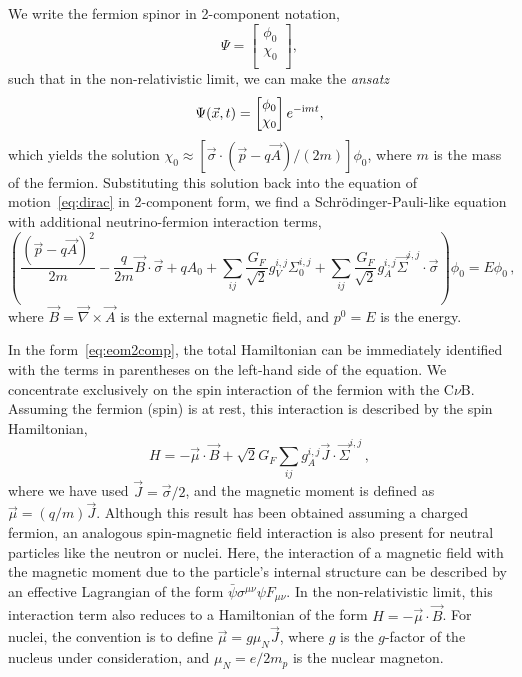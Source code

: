 \documentclass[aps,prd,10pt,twocolumn,superscriptaddress,floatfix,nofootinbib,amsmath,amssymb,altaffilletter,preprintnumbers]{revtex4-1}
\begin{document}
We write the fermion spinor in 2-component notation, 
\begin{equation}
\Psi= \begin{bmatrix}
           \phi_{0} \\
           \chi_{0} \\
         \end{bmatrix},
\end{equation}
such that in the non-relativistic limit, we can make the {\it ansatz} 
\begin{equation}
\Psi(\vec{x},t)= \begin{bmatrix}
           \phi_{0} \\
           \chi_{0} \\
         \end{bmatrix}e^{-{\rm i} m t} ,
\end{equation}
which yields the solution $\chi_0\approx [\vec{\sigma} \cdot (\vec{p} - q\vec{A})/(2m)]\phi_0$, where $m$ is the mass of the fermion.  
Substituting this solution back into the equation of motion~\eqref{eq:dirac} in 2-component form, we find a Schr\"{o}dinger-Pauli-like equation with additional neutrino-fermion interaction terms,
\begin{equation}
    \left(\frac{(\vec{p}-q\vec{A})^2}{2m} -\frac{q}{2m}\vec{B}\cdot \vec{\sigma}+qA_0 + \sum_{ij} \frac{G_F}{\sqrt{2}}g^{i,j}_V \Sigma^{i,j}_0+\sum_{ij}\frac{G_F}{\sqrt{2}}g^{i,j}_A\vec{\Sigma}^{i,j}\cdot\vec{\sigma}  \right) \phi_0 = E \phi_{0}\, ,
    \label{eq:eom2comp}
\end{equation}    
where $\vec{B}=\vec{\nabla}\times \vec{A}$ is the external magnetic field, and $p^{0}=E$ is the energy.

In the form~\eqref{eq:eom2comp}, the total Hamiltonian can be immediately identified with the terms in parentheses on the left-hand side of the equation.  We concentrate exclusively on the spin interaction of the fermion with the C$\nu$B. Assuming the fermion (spin) is at rest, this interaction is described by the spin Hamiltonian, 
\begin{equation}
   H = -\vec{\mu}\cdot \vec{B}+\sqrt{2}G_F  \sum_{ij} g^{i,j}_A\vec{J}\cdot\vec{\Sigma}^{i,j}\, ,
   \label{eq:spinint1}
\end{equation}
where we have used $\vec{J}=\vec{\sigma}/{2}$, and the magnetic moment is defined as $\vec{\mu}=(q/m)\vec{J}$. Although this result has been obtained assuming a charged fermion, an analogous spin-magnetic field interaction is also present for neutral particles like the neutron or nuclei.  Here, the interaction of a magnetic field with the magnetic moment due to the particle's internal structure can be described by an effective Lagrangian of the form $\bar{\psi} \sigma^{\mu\nu} \psi F_{\mu\nu}$. In the non-relativistic limit, this interaction term also reduces to a Hamiltonian of the form $H = -\vec{\mu}\cdot \vec{B}$. For nuclei, the convention is to define $\vec{\mu}=g\mu_N\vec{J}$, where $g$ is the $g$-factor of the nucleus under consideration, and $\mu_N=e/2m_p$ is the nuclear magneton.
\end{document}
